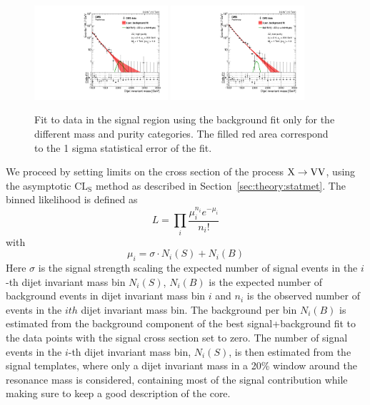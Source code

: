 \begin{figure}[h!]
\includegraphics[width=0.44\textwidth]{figures/analysis/search1/AN-15-211/fits/MLfits/BkgFit_DijetMassHighPuriZZ.pdf}
\includegraphics[width=0.44\textwidth]{figures/analysis/search1/AN-15-211/fits/MLfits/BkgFit_DijetMassLowPuriZZ.pdf}\\
\caption{Fit to data in the signal region using the background fit only for the different mass and purity categories. The filled red area correspond to the 1 sigma statistical error of the fit.}
\label{fig:search1:bkgfitMassCat}
\end{figure}

We proceed by setting limits on the cross section of the process $\text{X} \to \mathrm{V}\mathrm{V}$, using the asymptotic $\textrm{CL}_\textrm{S}$ method as described in Section~\ref{sec:theory:statmet}. The binned likelihood is defined as
\begin{equation}
L = \prod_i\frac{\mu^{n_i}_ie^{-\mu_i}}{n_i!}
\end{equation}
with
\begin{equation}
\mu_i=\sigma \cdot N_i(S)+N_i(B)
\end{equation}
Here $\sigma$ is the signal strength scaling the expected number of signal events in the $i$-th dijet invariant mass bin $N_i(S)$, $N_i(B)$ is the expected number of background events in dijet invariant mass bin $i$ and $n_i$ is the observed number of events in the $ith$ dijet invariant mass bin. The background per bin $N_i(B)$ is estimated from the background component of the best signal+background fit to the data points with the signal cross section set to zero. The number of signal events in the $i$-th dijet invariant mass bin, $N_i(S)$, is then estimated from the signal templates, where only a dijet invariant mass in a 20\% window around the resonance mass is considered, containing most of the signal contribution while making sure to keep a good description of the core.

